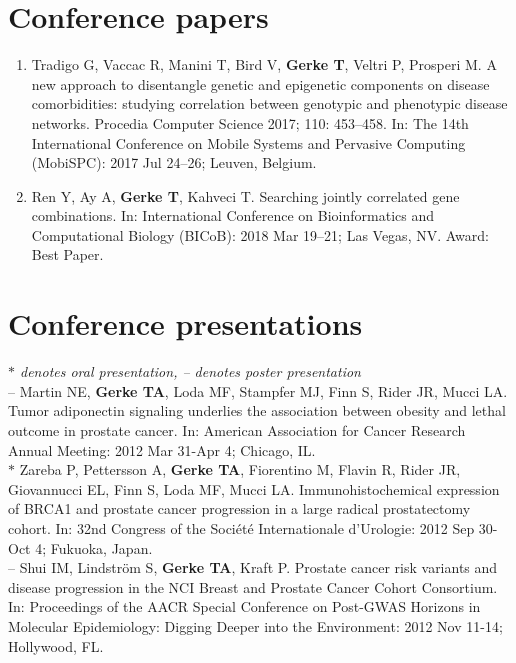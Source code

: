 \documentclass[11pt, a4paper]{article} %
\begin{document}
\section*{Conference papers}
\begin{enumerate}[leftmargin=*]
\item{} Tradigo G, Vaccac R, Manini T, Bird V, {\bf Gerke T}, Veltri P, Prosperi M. A new approach to disentangle genetic and epigenetic components on disease comorbidities: studying correlation between genotypic and phenotypic disease networks. Procedia Computer Science 2017; 110: 453--458. In: The 14th International Conference on Mobile Systems and Pervasive Computing (MobiSPC): 2017 Jul 24--26; Leuven, Belgium.

\item{} Ren Y, Ay A, {\bf Gerke T}, Kahveci T. Searching jointly correlated gene combinations. In: International Conference on Bioinformatics and Computational Biology (BICoB): 2018 Mar 19--21; Las Vegas, NV. Award: Best Paper. 
\end{enumerate}

\section*{Conference presentations}
\vspace{-.3cm}
{\footnotesize\emph{$*$ denotes oral presentation, -- denotes poster presentation}}\\

-- Martin NE, {\bf Gerke TA}, Loda MF, Stampfer MJ, Finn S, Rider JR, Mucci LA. Tumor adiponectin signaling underlies the association between obesity and lethal outcome in prostate cancer. In: American Association for Cancer Research Annual Meeting: 2012 Mar 31-Apr 4; Chicago, IL.\\

$*$ Zareba P, Pettersson A, {\bf Gerke TA}, Fiorentino M, Flavin R, Rider JR, Giovannucci EL, Finn S, Loda MF, Mucci LA. Immunohistochemical expression of BRCA1 and prostate cancer progression in  a large radical prostatectomy cohort. In: 32nd Congress of the Soci\'{e}t\'{e} Internationale d'Urologie: 2012 Sep 30-Oct 4; Fukuoka, Japan.\\

-- Shui IM, Lindstr\"{o}m S, {\bf Gerke TA}, Kraft P. Prostate cancer risk variants and disease progression in the NCI Breast and Prostate Cancer Cohort Consortium. In: Proceedings of the AACR Special Conference on Post-GWAS Horizons in Molecular Epidemiology: Digging Deeper into the Environment: 2012 Nov 11-14; Hollywood, FL.\\
\end{document}
